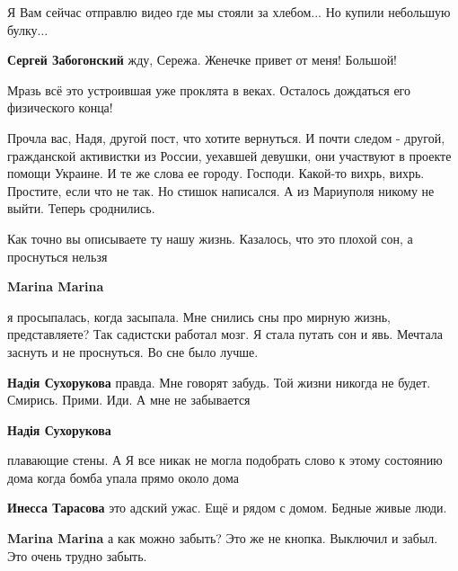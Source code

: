 \begin{itemize}
Я Вам сейчас отправлю видео где мы стояли за хлебом... Но купили небольшую
булку...

\textbf{Сергей Забогонский} жду, Сережа. Женечке привет от меня! Большой!

Мразь всё это устроившая уже проклята в веках. Осталось дождаться его физического конца!


Прочла вас, Надя, другой пост, что хотите вернуться. И почти следом - другой,
гражданской активистки из России, уехавшей девушки, они участвуют в проекте
помощи Украине. И те же слова ее городу. Господи. Какой-то вихрь, вихрь.
Простите, если что не так. Но стишок написался. А из Мариуполя никому не выйти.
Теперь сроднились.

Как точно вы описываете ту нашу жизнь. Казалось, что это плохой сон, а проснуться нельзя

\begin{itemize} %
\textbf{Marina Marina} 

я просыпалась, когда засыпала. Мне снились сны про мирную жизнь, представляете?
Так садистски работал мозг. Я стала путать сон и явь. Мечтала заснуть и не
проснуться. Во сне было лучше.

\textbf{Надія Сухорукова} правда. Мне говорят забудь. Той жизни никогда не будет. Смирись. Прими. Иди. А мне не забывается

\textbf{Надія Сухорукова} 

плавающие стены. А Я все никак не могла подобрать слово к этому состоянию дома
когда бомба упала прямо около дома

\textbf{Инесса Тарасова} это адский ужас. Ещё и рядом с домом. Бедные живые люди.

\textbf{Marina Marina} а как можно забыть? Это же не кнопка. Выключил и забыл. Это очень трудно забыть.
\end{itemize} %


\end{itemize} %
